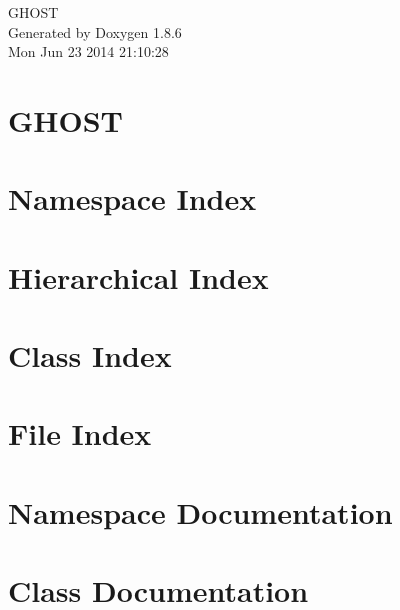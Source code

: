 \documentclass[twoside]{book}
\newcommand{\clearemptydoublepage}{%
  \newpage{\pagestyle{empty}\cleardoublepage}%
}
\begin{document}
\hypersetup{pageanchor=false}
\begin{titlepage}
\vspace*{7cm}
\begin{center}%
{\Large G\-H\-O\-S\-T }\\
\vspace*{1cm}
{\large Generated by Doxygen 1.8.6}\\
\vspace*{0.5cm}
{\small Mon Jun 23 2014 21:10:28}\\
\end{center}
\end{titlepage}
\clearemptydoublepage
\tableofcontents
\clearemptydoublepage
{}
\hypersetup{pageanchor=true}

\chapter{G\-H\-O\-S\-T}
\label{index}\hypertarget{index}{}
\chapter{Namespace Index}

\chapter{Hierarchical Index}

\chapter{Class Index}

\chapter{File Index}

\chapter{Namespace Documentation}

\chapter{Class Documentation}



















\end{document}
